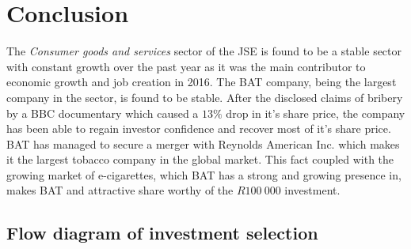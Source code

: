 \documentclass[letterpaper, 10 pt, conference]{ieeeconf}  %
\begin{document}
\section{Conclusion}

The \textit{Consumer goods and services} sector of the JSE is found to be a stable sector with constant growth over the past year as it was the main contributor to economic growth and job creation in 2016. The BAT company, being the largest company in the sector, is found to be stable. After the disclosed claims of bribery by a BBC documentary which caused a $13\%$ drop in it's share price, the company has been able to regain investor confidence and recover most of it's share price. BAT has managed to secure a merger with Reynolds American Inc. which makes it the largest tobacco company in the global market. This fact coupled with the growing market of e-cigarettes, which BAT has a strong and growing presence in, makes BAT and attractive share worthy of the $R100 ~ 000$ investment.



 

\cleardoublepage
\appendix

\subsection{Flow diagram of investment selection}
\end{document}
